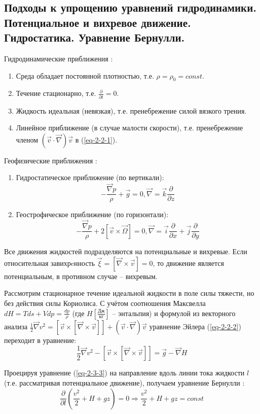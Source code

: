 \subsection{Подходы к упрощению уравнений гидродинамики. Потенциальное и вихревое движение. Гидростатика. Уравнение Бернулли.}
Гидродинамические приближения \cite{Nosov2019-6}:
\begin{enumerate}
\item Среда обладает постоянной плотностью, т.е. $\rho=\rho_0=const$.
\item Течение стационарно, т.е. $\frac{\partial}{\partial t}=0$.
\item Жидкость идеальная (невязкая), т.е. пренебрежение силой вязкого трения.
\item Линейное приближение (в случае малости скорости), т.е. пренебрежение членом $\left(\vec{v}\cdot\vec{\nabla}\right)\vec{v}$ в (\ref{eq-2-2-1}).
\end{enumerate}
Геофизические приближения \cite{Nosov2019-6}:
\begin{enumerate}
\item Гидростатическое приближение (по вертикали):
\begin{equation}\label{eq-2-3-1}
-\frac{\vec{\nabla}p}{\rho}+\vec{g}=0, \vec{\nabla}=\vec{k}\frac{\partial}{\partial z}
\end{equation}
\item Геострофическое приближение (по горизонтали):
\begin{equation}\label{eq-2-3-2}
-\frac{\vec{\nabla}p}{\rho}+2\left[\vec{v}\times\vec{\Omega}\right]=0, \vec{\nabla}=\vec{i}\frac{\partial}{\partial x}+\vec{j}\frac{\partial}{\partial y}
\end{equation}
\end{enumerate}

Все движения жидкостей подразделяются на потенциальные и вихревые.
Если относительная завихрeнность $\vec{\xi}=\left[\vec{\nabla}\times\vec{v}\right]=0$, то движение является потенциальным, в противном случае -- вихревым.

Рассмотрим стационарное течение идеальной жидкости в поле силы тяжести, но без действия силы Кориолиса.
С учётом соотношения Максвелла $dH=Tds+Vdp=\frac{dp}{\rho}$ (где $H \left[\frac{\text{Дж}}{\text{кг}}\right]$ -- энтальпия) и формулой из векторного анализа $\frac{1}{2}\vec{\nabla}v^2=\left[\vec{v}\times\left[\vec{\nabla}\times\vec{v}\right]\right]+\left(\vec{v}\cdot\vec{\nabla}\right)\vec{v}$ уравнение Эйлера (\ref{eq-2-2-2}) переходит в уравнение:
\begin{equation}\label{eq-2-3-3}
\frac{1}{2}\vec{\nabla}v^2 -\left[\vec{v}\times\left[\vec{\nabla}\times\vec{v}\right]\right]=\vec{g}-\vec{\nabla}H
\end{equation}

Проецируя уравнение (\ref{eq-2-3-3}) на направление вдоль линии тока жидкости $l$ (т.е. рассматривая потенциальное движение), получаем уравнение Бернулли \cite{Ландау-Лившиц-1986}:
\begin{equation}\label{eq-2-3-4}
\frac{\partial}{\partial l}\left(\frac{v^2}{2}+H+gz\right)=0\Rightarrow\frac{v^2}{2}+H+gz=const
\end{equation}
